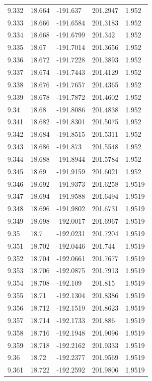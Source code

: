 \begin{tabular}{lllll}
9.332 & 18.664 & -191.637 & 201.2947 & 1.952 \\
9.333 & 18.666 & -191.6584 & 201.3183 & 1.952 \\
9.334 & 18.668 & -191.6799 & 201.342 & 1.952 \\
9.335 & 18.67 & -191.7014 & 201.3656 & 1.952 \\
9.336 & 18.672 & -191.7228 & 201.3893 & 1.952 \\
9.337 & 18.674 & -191.7443 & 201.4129 & 1.952 \\
9.338 & 18.676 & -191.7657 & 201.4365 & 1.952 \\
9.339 & 18.678 & -191.7872 & 201.4602 & 1.952 \\
9.34 & 18.68 & -191.8086 & 201.4838 & 1.952 \\
9.341 & 18.682 & -191.8301 & 201.5075 & 1.952 \\
9.342 & 18.684 & -191.8515 & 201.5311 & 1.952 \\
9.343 & 18.686 & -191.873 & 201.5548 & 1.952 \\
9.344 & 18.688 & -191.8944 & 201.5784 & 1.952 \\
9.345 & 18.69 & -191.9159 & 201.6021 & 1.952 \\
9.346 & 18.692 & -191.9373 & 201.6258 & 1.9519 \\
9.347 & 18.694 & -191.9588 & 201.6494 & 1.9519 \\
9.348 & 18.696 & -191.9802 & 201.6731 & 1.9519 \\
9.349 & 18.698 & -192.0017 & 201.6967 & 1.9519 \\
9.35 & 18.7 & -192.0231 & 201.7204 & 1.9519 \\
9.351 & 18.702 & -192.0446 & 201.744 & 1.9519 \\
9.352 & 18.704 & -192.0661 & 201.7677 & 1.9519 \\
9.353 & 18.706 & -192.0875 & 201.7913 & 1.9519 \\
9.354 & 18.708 & -192.109 & 201.815 & 1.9519 \\
9.355 & 18.71 & -192.1304 & 201.8386 & 1.9519 \\
9.356 & 18.712 & -192.1519 & 201.8623 & 1.9519 \\
9.357 & 18.714 & -192.1733 & 201.886 & 1.9519 \\
9.358 & 18.716 & -192.1948 & 201.9096 & 1.9519 \\
9.359 & 18.718 & -192.2162 & 201.9333 & 1.9519 \\
9.36 & 18.72 & -192.2377 & 201.9569 & 1.9519 \\
9.361 & 18.722 & -192.2592 & 201.9806 & 1.9519 \\

\end{tabular}
